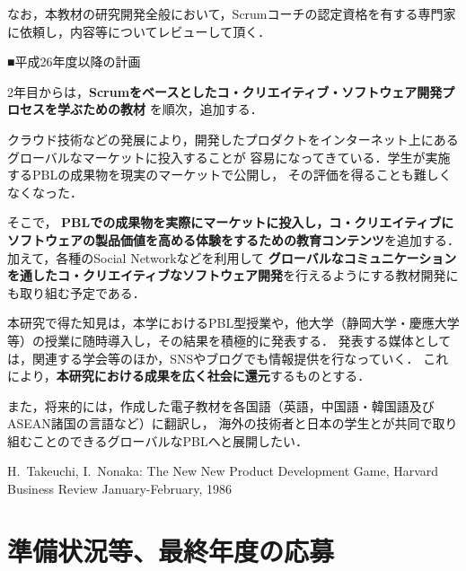 \documentclass[11pt,a4paper,twoside]{jarticle}
\newcommand{\研究種別}{C}	%
\newcommand{\研究課題名}{コ・クリエイティブなソフトウェア開発者を育成するPBL型教育}
\newcommand{\研究機関名}{産業技術大学院大学}
\newcommand{\研究代表者氏名}{中鉢　欣秀}
\newcommand{\研究代表者氏名ふりがな}{ちゅうばち　よしひで}
\newcommand{\本応募effort}{\KLEffort{18}}	%
\newcommand{\研究期間の最終元号年度}{27}	%
\begin{document}
{	なお，本教材の研究開発全般において，Scrumコーチの認定資格を有する専門家に依頼し，内容等についてレビューして頂く．

	\begin{flushleft}
		■平成26年度以降の計画
	\end{flushleft}
	
	2年目からは，{\bf Scrumをベースとしたコ・クリエイティブ・ソフトウェア開発プロセスを学ぶための教材}
	を順次，追加する．

	クラウド技術などの発展により，開発したプロダクトをインターネット上にあるグローバルなマーケットに投入することが
	容易になってきている．学生が実施するPBLの成果物を現実のマーケットで公開し，
	その評価を得ることも難しくなくなった．
	
	そこで，
	{\bf PBLでの成果物を実際にマーケットに投入し，コ・クリエイティブにソフトウェアの製品価値を高める体験をするための教育コンテンツ}を追加する．
	加えて，各種のSocial Networkなどを利用して
	{\bf グローバルなコミュニケーションを通したコ・クリエイティブなソフトウェア開発}を行えるようにする教材開発にも取り組む予定である．

	本研究で得た知見は，本学におけるPBL型授業や，他大学（静岡大学・慶應大学等）の授業に随時導入し，その結果を積極的に発表する．
	発表する媒体としては，関連する学会等のほか，SNSやブログでも情報提供を行なっていく．
	これにより，{\bf 本研究における成果を広く社会に還元}するものとする．
	
	また，将来的には，作成した電子教材を各国語（英語，中国語・韓国語及びASEAN諸国の言語など）に翻訳し，
	海外の技術者と日本の学生とが共同で取り組むことのできるグローバルなPBLへと展開したい．
	
	\vspace{1cm}
	\begin{thebibliography}{99}
		 H.~Takeuchi, I.~Nonaka: The New New Product Development Game, Harvard Business Review January-February, 1986
	\end{thebibliography}
}

\section{準備状況等、最終年度の応募}
\end{document}
